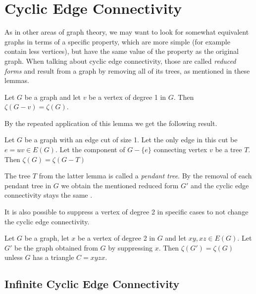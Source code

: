 \chapter{Cyclic Edge Connectivity}\label{ch:cyclic-edge-connectivity}


As in other areas of graph theory, we may want to look for somewhat equivalent graphs in terms of a specific property, which are more simple (for example contain less vertices), but have the same value of the property as the original graph. When talking about cyclic edge connectivity, those are called \textit{reduced forms} and result from a graph by removing all of its trees, as mentioned in these lemmas.

\begin{lemma}
	Let $G$ be a graph and let $v$ be a vertex of degree 1 in $G$. Then $\zeta(G-v)=\zeta(G)$. 
\end{lemma}

By the repeated application of this lemma we get the following result.

\begin{lemma}
	Let $G$ be a graph with an edge cut of size 1. Let the only edge in this cut be $e=uv\in E(G)$. Let the component of $G-\{e\}$ connecting vertex $v$ be a tree $T$. Then $\zeta(G)=\zeta(G-T)$ 
\end{lemma}

The tree $T$ from the latter lemma is called a \textit{pendant tree}. By the removal of each pendant tree in $G$ we obtain the mentioned reduced form $G'$ and the cyclic edge connectivity stays the same \cite{Lou2008}.

It is also possible to suppress a vertex of degree 2 in specific cases to not change the cyclic edge connectivity.

\begin{lemma}
	Let $G$ be a graph, let $x$ be a vertex of degree 2 in $G$ and let $xy, xz\in E(G)$. Let $G'$ be the graph obtained from $G$ by suppressing $x$. Then $\zeta(G')=\zeta(G)$ unless $G$ has a triangle $C=xyzx$. 
\end{lemma}

\section{Infinite Cyclic Edge Connectivity}

